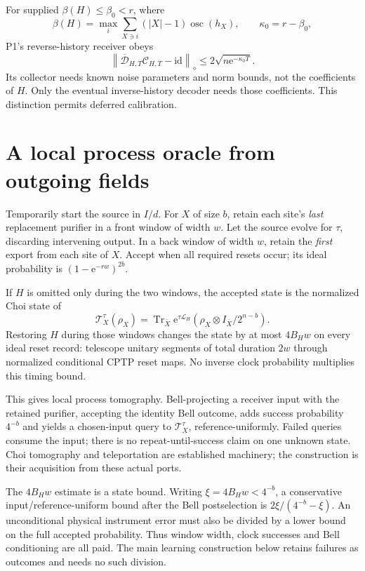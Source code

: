 \documentclass[11pt]{article}
\newcommand{\id}{\mathrm{id}}
\newcommand{\Tr}{\operatorname{Tr}}
\newcommand{\norm}[1]{\left\lVert #1\right\rVert}
\newcommand{\cL}{\mathcal L}
\newcommand{\cD}{\mathcal D}
\newcommand{\cC}{\mathcal C}
\newcommand{\ee}{\mathrm e}
\begin{document}
For supplied \(\beta(H)\le\beta_0<r\), where
\[
\beta(H)=\max_i\sum_{X\ni i}(|X|-1)\operatorname{osc}(h_X),\qquad \kappa_0=r-\beta_0,
\]
P1's reverse-history receiver obeys
\begin{equation}
\norm{\overline{\cD}_{H,T}\cC_{H,T}-\id}_\diamond\le2\sqrt{n\ee^{-\kappa_0T}}.
\label{eq:p1}
\end{equation}
Its collector needs known noise parameters and norm bounds, not the coefficients of \(H\). Only the eventual inverse-history decoder needs those coefficients. This distinction permits deferred calibration.

\section{A local process oracle from outgoing fields}
Temporarily start the source in \(I/d\). For \(X\) of size \(b\), retain each site's \emph{last} replacement purifier in a front window of width \(w\). Let the source evolve for \(\tau\), discarding intervening output. In a back window of width \(w\), retain the \emph{first} export from each site of \(X\). Accept when all required resets occur; its ideal probability is \((1-\ee^{-rw})^{2b}\).

If \(H\) is omitted only during the two windows, the accepted state is the normalized Choi state of
\[
\mathcal T_X^\tau(\rho_X)=\Tr_{\bar X}\ee^{\tau\cL_H}
(\rho_X\otimes I_{\bar X}/2^{n-b}).
\]
Restoring \(H\) during those windows changes the state by at most \(4B_Hw\) on every ideal reset record: telescope unitary segments of total duration \(2w\) through normalized conditional CPTP reset maps. No inverse clock probability multiplies this timing bound.

This gives local process tomography. Bell-projecting a receiver input with the retained purifier, accepting the identity Bell outcome, adds success probability \(4^{-b}\) and yields a chosen-input query to \(\mathcal T_X^\tau\), reference-uniformly. Failed queries consume the input; there is no repeat-until-success claim on one unknown state. Choi tomography and teleportation are established machinery; the construction is their acquisition from these actual ports.

The \(4B_Hw\) estimate is a state bound. Writing \(\xi=4B_Hw<4^{-b}\),
a conservative input/reference-uniform bound after the Bell postselection is
\(2\xi/(4^{-b}-\xi)\). An unconditional physical instrument error must also
be divided by a lower bound on the full accepted probability. Thus window
width, clock successes and Bell conditioning are all paid. The main learning
construction below retains failures as outcomes and needs no such division.
\end{document}
